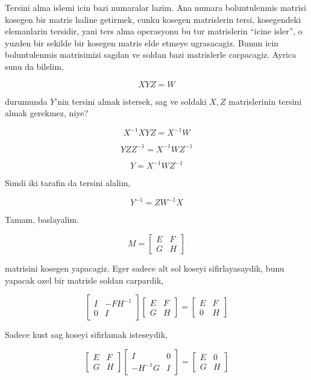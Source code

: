 \documentclass[12pt,fleqn]{article}\usepackage{../common}
\begin{document}
Tersini alma islemi icin bazi numaralar lazim. Ana numara boluntulenmis matrisi 
kosegen bir matris haline getirmek, cunku kosegen matrislerin tersi,
kosegendeki elemanlarin tersidir, yani ters alma operasyonu bu tur
matrislerin ``icine isler'', o yuzden bir sekilde bir kosegen matris
elde etmeye ugrasacagiz. Bunun icin boluntulenmis matrisimizi sagdan ve
soldan bazi matrislerle carpacagiz. Ayrica sunu da bilelim, 

\[ XYZ = W \]

durumunda $Y$'nin tersini almak istersek, sag ve soldaki $X,Z$
matrislerinin tersini almak gerekmez, niye?

\[ X^{-1}XYZ = X^{-1}W \]

\[ YZZ^{-1} = X^{-1}WZ^{-1} \]

\[ Y = X^{-1}WZ^{-1} \]

Simdi iki tarafin da tersini alalim, 

\[ Y^{-1} = ZW^{-1}X \]

Tamam, baslayalim. 

\[ M = 
\left[\begin{array}{rr}
E & F \\
G & H
\end{array}\right] 
 \]

matrisini kosegen yapacagiz. Eger sadece alt sol koseyi sifirlayasaydik, 
bunu yapacak ozel bir matrisle soldan carpardik,

\[ 
\left[\begin{array}{rr}
I & -FH^{-1} \\
0 & I
\end{array}\right] 
\left[\begin{array}{rr}
E & F \\
G & H
\end{array}\right] = 
\left[\begin{array}{rr}
E & F \\
0 & H
\end{array}\right] 
 \]

Sadece kust sag koseyi sifirlamak isteseydik,

\[ 
\left[\begin{array}{rr}
E & F \\
G & H
\end{array}\right] 
\left[\begin{array}{rr}
I & 0 \\
-H^{-1}G & I
\end{array}\right] 
=
\left[\begin{array}{rr}
E & 0 \\
G & H
\end{array}\right] 
 \]
\end{document}
